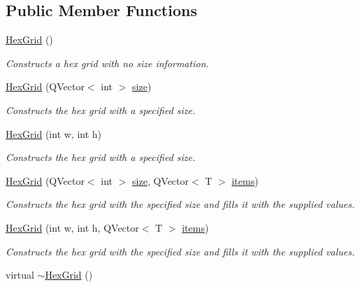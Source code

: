 \subsection*{\-Public \-Member \-Functions}
\begin{DoxyCompactItemize}
\item 
\hypertarget{classhsom_1_1_hex_grid_a561fff2cdd479c0ea385229d47ae0de8}{\hyperlink{classhsom_1_1_hex_grid_a561fff2cdd479c0ea385229d47ae0de8}{\-Hex\-Grid} ()}\label{classhsom_1_1_hex_grid_a561fff2cdd479c0ea385229d47ae0de8}

\begin{DoxyCompactList}\small\item\em \-Constructs a hex grid with no size information. \end{DoxyCompactList}\item 
\hyperlink{classhsom_1_1_hex_grid_a116810466306642ff20c1f5a47d2fcdc}{\-Hex\-Grid} (\-Q\-Vector$<$ int $>$ \hyperlink{classhsom_1_1_grid_a3e846473299eb2c7c259659eb61a6234}{size})
\begin{DoxyCompactList}\small\item\em \-Constructs the hex grid with a specified size. \end{DoxyCompactList}\item 
\hyperlink{classhsom_1_1_hex_grid_a6ec57bd99b207a2de3b5464f363aefef}{\-Hex\-Grid} (int w, int h)
\begin{DoxyCompactList}\small\item\em \-Constructs the hex grid with a specified size. \end{DoxyCompactList}\item 
\hyperlink{classhsom_1_1_hex_grid_a9ba65c149bec76393d7c20b746f1b023}{\-Hex\-Grid} (\-Q\-Vector$<$ int $>$ \hyperlink{classhsom_1_1_grid_a3e846473299eb2c7c259659eb61a6234}{size}, \-Q\-Vector$<$ \-T $>$ \hyperlink{classhsom_1_1_grid_ae6b6ffb72e86c3904e8ac21253d85a24}{items})
\begin{DoxyCompactList}\small\item\em \-Constructs the hex grid with the specified size and fills it with the supplied values. \end{DoxyCompactList}\item 
\hyperlink{classhsom_1_1_hex_grid_a204c75cb7144f624a1456dd47eb93efe}{\-Hex\-Grid} (int w, int h, \-Q\-Vector$<$ \-T $>$ \hyperlink{classhsom_1_1_grid_ae6b6ffb72e86c3904e8ac21253d85a24}{items})
\begin{DoxyCompactList}\small\item\em \-Constructs the hex grid with the specified size and fills it with the supplied values. \end{DoxyCompactList}\item 
\hypertarget{classhsom_1_1_hex_grid_a7a5cec068de3378626aab09127f844c5}{virtual \hyperlink{classhsom_1_1_hex_grid_a7a5cec068de3378626aab09127f844c5}{$\sim$\-Hex\-Grid} ()}\label{classhsom_1_1_hex_grid_a7a5cec068de3378626aab09127f844c5}


\end{DoxyCompactItemize}

